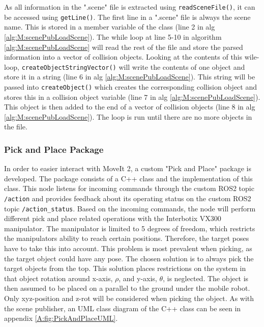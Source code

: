 As all information in the ".scene" file is extracted using \lstinline{readSceneFile()}, it can be accessed using \lstinline{getLine()}. The first line in a ".scene" file is always the scene name. This is stored in a member variable of the class (line 2 in alg \ref{alg:M:scenePubLoadScene}). The while loop at line 5-10 in algorithm \ref{alg:M:scenePubLoadScene} will read the rest of the file and store the parsed information into a vector of collision objects. Looking at the contents of this wile-loop, \lstinline{createObjectStringVector()} will write the contents of one object and store it in a string (line 6 in alg \ref{alg:M:scenePubLoadScene}). This string will be passed into \lstinline{createObject()} which creates the corresponding collision object and stores this in a collision object variable (line 7 in alg \ref{alg:M:scenePubLoadScene}). This object is then added to the end of a vector of collision objects (line 8 in alg \ref{alg:M:scenePubLoadScene}). The loop is run until there are no more objects in the file. 


\FloatBarrier
\subsubsection{Pick and Place Package} \label{sec:M:A:HuskyPickAndPlace}
In order to easier interact with MoveIt 2, a custom "Pick and Place" package is developed. The package consists of a C++ class and the implementation of this class. This node listens for incoming commands through the custom ROS2 topic \lstinline{/action} and provides feedback about its operating status on the custom ROS2 topic \lstinline{/action_status}. Based on the incoming commands, the node will perform different pick and place related operations with the Interbotix VX300 manipulator. The manipulator is limited to 5 degrees of freedom, which restricts the manipulators ability to reach certain positions. Therefore, the target poses have to take this into account. This problem is most prevalent when picking, as the target object could have any pose.
The chosen solution is to always pick the target objects from the top. This solution places restrictions on the system in that object rotation around x-axis, $\rho$, and y-axis, $\theta$, is neglected. The object is then assumed to be placed on a parallel to the ground under the mobile robot. Only xyz-position and z-rot will be considered when picking the object. As with the scene publisher, an UML class diagram of the C++ class can be seen in appendix \ref{A:fig:PickAndPlaceUML}.

